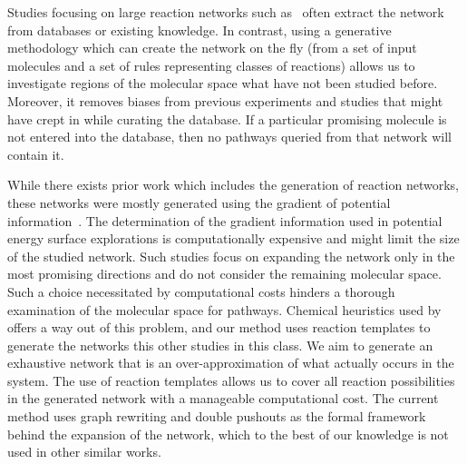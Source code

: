 Studies focusing on large reaction networks such as~\cite{crn_expand_qm,shortest_path_hypergraph1,shortest_path_hypergraph2,reported_network} often extract the network from databases or existing knowledge. In contrast, using a generative methodology which can create the network on the fly (from a set of input molecules and a set of rules representing classes of reactions) allows us to investigate regions of the molecular space what have not been studied before. Moreover, it removes biases from previous experiments and studies that might have crept in while curating the database. If a particular promising molecule is not entered into the database, then no pathways queried from that network will contain it.

While there exists prior work which includes the generation of reaction networks, these networks were mostly generated using the gradient of potential information~\cite{iminoacetaldehyde2,yarp,empi1}. The determination of the gradient information used in potential energy surface explorations is computationally expensive and might limit the size of the studied network. Such studies focus on expanding the network only in the most promising directions and do not consider the remaining molecular space. Such a choice necessitated by computational costs hinders a thorough examination of the molecular space for pathways.  Chemical heuristics used by~\cite{yaks,heuristic_expert} offers a way out of this problem, and our method uses reaction templates to generate the networks this other studies in this class. We aim to generate an exhaustive network that is an over-approximation of what actually occurs in the system. The use of reaction templates allows us to cover all reaction possibilities in the generated network with a manageable computational cost. The current method uses graph rewriting and double pushouts as the formal framework behind the expansion of the network, which to the best of our knowledge is not used in other similar works.

